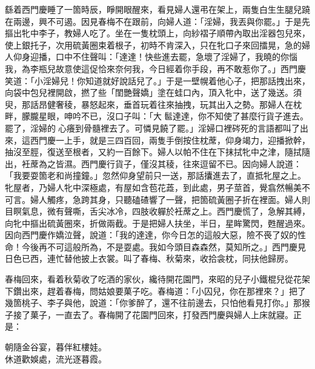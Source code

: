 繇着西門慶睡了一箇時辰，睜開眼醒來，看見婦人還弔在架上，兩隻白生生腿兒蹺在兩邊，興不可遏。{}因見春梅不在跟前，向婦人道：「淫婦，我丟與你罷。」{}于是先摳出牝中李子，教婦人吃了。{}坐在一隻枕頭上，向紗褶子順帶內取出淫器包兒來，使上銀托子，次用硫黃圈束着根子，初時不肯深入，只在牝口子來回擂晃，急的婦人仰身迎播，口中不住聲叫：「達達！快些進去罷，急壞了淫婦了，我曉的你惱我，為李瓶兒故意使這促恰來奈何我，今日經着你手段，再不敢惹你了。」{}西門慶笑道：「小淫婦兒！你知道就好說話兒了。」于是一壁幌着他心子，把那話拽出來，向袋中包兒裡開啟，撚了些「閨艷聲嬌」塗在蛙口內，頂入牝中，送了幾送。須臾，那話昂健奢稜，暴怒起來，垂首玩着往來抽拽，玩其出入之勢。那婦人在枕畔，朦朧星眼，呻吟不已，沒口子叫：「大𩫻䯲達達，你不知使了甚麼行貨子進去。罷了，淫婦的𣭈心癢到骨髓裡去了。可憐見饒了罷。」淫婦口裡硶死的言語都叫了出來，這西門慶一上手，就是三四百回，兩隻手倒按住枕蓆，仰身竭力，迎播掀幹，抽沒至脛，復送至根者，又約一百餘下。婦人以帕不住在下抹拭牝中之津，隨拭隨出，衽蓆為之皆濕。西門慶行貨子，僅沒其稜，往來逗留不已。因向婦人說道：「我要耍箇老和尚撞鐘。」忽然仰身望前只一送，那話攮進去了，直抵牝屋之上。牝屋者，乃婦人牝中深極處，有屋如含苞花蕋，到此處，男子莖首，覺翕然暢美不可言。婦人觸疼，急跨其身，只聽磕碴響了一聲，把箇硫黃圈子折在裡面。婦人則目瞑氣息，微有聲嘶，舌尖冰冷，四肢收軃於衽蓆之上。西門慶慌了，急解其縛，向牝中摳出硫黃圈來，折做兩截。于是把婦人扶坐，半日，星眸驚閃，甦醒過來。因向西門慶作嬌泣聲，{}說道：「我的達達，你今日怎的這般大惡，險不䘮了奴的性命！今後再不可這般所為，不是耍處。我如今頭目森森然，莫知所之。」{}西門慶見日色已西，連忙替他披上衣裳。叫了春梅、秋菊來，收拾衾枕，同扶他歸房。

春梅回來，看着秋菊收了吃酒的家伙，纔待開花園門，來昭的兒子小鐵棍兒從花架下鑽出來，趕着春梅，問姑娘要菓子吃。春梅道：「小囚兒，你在那裡來？」把了幾箇桃子、李子與他，說道：「你爹醉了，還不往前邊去，只怕他看見打你。」那猴子接了菓子，一直去了。春梅開了花園門回來，打發西門慶與婦人上床就寢。正是：

\begin{myquote}
朝隨金谷宴，暮伴紅樓娃。\\休道歡娛處，流光逐暮霞。
\end{myquote}

